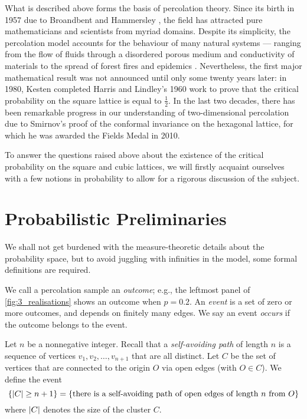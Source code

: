 \documentclass[a4paper, 12pt]{article}
\begin{document}
What is described above forms the basis of percolation theory. Since its birth in 1957 due to Broandbent and Hammersley \autocite*[693]{broadbent_hammersley_1957}, the field has attracted pure mathematicians and scientists from myriad domains. Despite its simplicity, the percolation model accounts for the behaviour of many natural systems --- ranging from the flow of fluids through a disordered porous medium and conductivity of materials to the spread of forest fires and epidemics \autocite[60]{gennes_2000}. Nevertheless, the first major mathematical result was not announced until only some twenty years later: in 1980, Kesten \autocite*[41]{kesten_1980} completed Harris and Lindley's \autocite*[13]{harris_lindley_1960} 1960 work to prove that the critical probability on the square lattice is equal to $\frac{1}{2}$. In the last two decades, there has been remarkable progress in our understanding of two-dimensional percolation due to Smirnov's \autocite*[239]{smirnov_2001} proof of the conformal invariance on the hexagonal lattice, for which he was awarded the Fields Medal in 2010.

To answer the questions raised above about the existence of the critical probability on the square and cubic lattices, we will firstly acquaint ourselves with a few notions in probability to allow for a rigorous discussion of the subject.

\section{Probabilistic Preliminaries}
We shall not get burdened with the measure-theoretic details about the probability space, but to avoid juggling with infinities in the model, some formal definitions are required.

\begin{defn}\label{defn:outcome_and_event}
We call a percolation sample an \textit{outcome}; e.g., the leftmost panel of \cref{fig:3_realisations} shows an outcome when $p = 0.2$. An \textit{event} is a set of zero or more outcomes, and depends on finitely many edges. We say an event \textit{occurs} if the outcome belongs to the event.
\end{defn}

\begin{ex}\label{ex:cluster_of_size_n}
Let $n$ be a nonnegative integer. Recall that a \textit{self-avoiding path} of length $n$ is a sequence of vertices $v_1, v_2, \dots, v_{n + 1}$ that are all distinct.
Let $C$ be the set of vertices that are connected to the origin $O$ via open edges (with $O \in C$). We define the event
\[
\{\lvert C \rvert \geq n + 1\}
= \{\text{there is a self-avoiding path of open edges of length } n \text{ from } O\}
\]
where $\lvert C \rvert$ denotes the size of the cluster $C$.

\end{ex}
\end{document}
